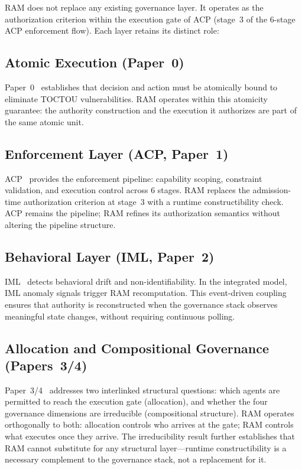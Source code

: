 \documentclass[11pt]{article}
\begin{document}
RAM does not replace any existing governance layer. It operates as the authorization
criterion within the execution gate of ACP (stage~3 of the 6-stage ACP enforcement
flow). Each layer retains its distinct role:

\subsection{Atomic Execution (Paper~0)}

Paper~0~\cite{fernandez2026a} establishes that decision and action must be atomically
bound to eliminate TOCTOU vulnerabilities. RAM operates within this atomicity guarantee:
the authority construction and the execution it authorizes are part of the same atomic
unit.

\subsection{Enforcement Layer (ACP, Paper~1)}

ACP~\cite{fernandez2026b} provides the enforcement pipeline: capability scoping,
constraint validation, and execution control across 6 stages. RAM replaces the
admission-time authorization criterion at stage~3 with a runtime constructibility check.
ACP remains the pipeline; RAM refines its authorization semantics without altering the
pipeline structure.

\subsection{Behavioral Layer (IML, Paper~2)}

IML~\cite{fernandez2026c} detects behavioral drift and non-identifiability. In the
integrated model, IML anomaly signals trigger RAM recomputation. This event-driven
coupling ensures that authority is reconstructed when the governance stack observes
meaningful state changes, without requiring continuous polling.

\subsection{Allocation and Compositional Governance (Papers~3/4)}

Paper~3/4~\cite{fernandez2026govstr} addresses two interlinked structural questions:
which agents are permitted to reach the execution gate (allocation), and whether the
four governance dimensions are irreducible (compositional structure). RAM operates
orthogonally to both: allocation controls who arrives at the gate; RAM controls what
executes once they arrive. The irreducibility result further establishes that RAM
cannot substitute for any structural layer---runtime constructibility is a necessary
complement to the governance stack, not a replacement for it.
\end{document}
